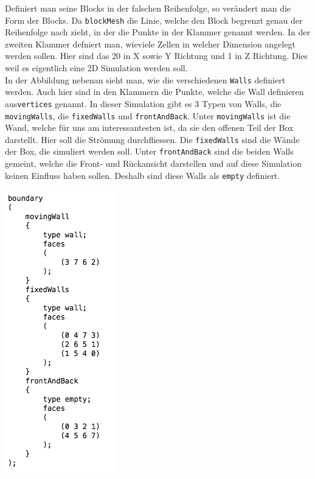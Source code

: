 \begin{refsection}
\begin{minipage}{0.5 \linewidth}
Definiert man seine Blocks in der falschen Reihenfolge, so verändert man die Form der Blocks. Da \texttt{blockMesh} die Linie, welche den Block begrenzt genau der Reihenfolge nach zieht, in der die Punkte in der Klammer genannt werden. In der zweiten Klammer defniert man, wieviele Zellen in welcher Dimension angelegt werden sollen.  Hier sind das 20 in X sowie Y Richtung und 1 in Z Richtung. Dies weil es eigentlich eine 2D Simulation werden soll. \\
In der Abbildung nebenan sieht man, wie die verschiedenen \texttt{Walls} definiert werden. Auch hier sind in den Klammern die Punkte, welche die Wall definieren aus\texttt{vertices} genannt. In dieser Simulation gibt es 3 Typen von Walls, die \texttt{movingWalls}, die \texttt{fixedWalls} und  \texttt{frontAndBack}. Unter \texttt{movingWalls} ist die Wand, welche für uns am interessantesten ist, da sie den offenen Teil der Box darstellt. Hier soll die Strömung durchfliessen. Die \texttt{fixedWalls} sind die Wände der Box, die simuliert werden soll. Unter \texttt{frontAndBack} sind die beiden Walls gemeint, welche die Front- und Rückansicht darstellen und auf diese Simulation keinen Einfluss haben sollen. Deshalb sind diese Walls als \texttt{empty} definiert.\\
\end{minipage}
\begin{minipage}{0.5 \linewidth}
\hspace{0.5 cm}
\includegraphics[width = 0.5 \linewidth]{./OpenFOAM/Pics/Walls.png}

\end{minipage}
\end{refsection}
